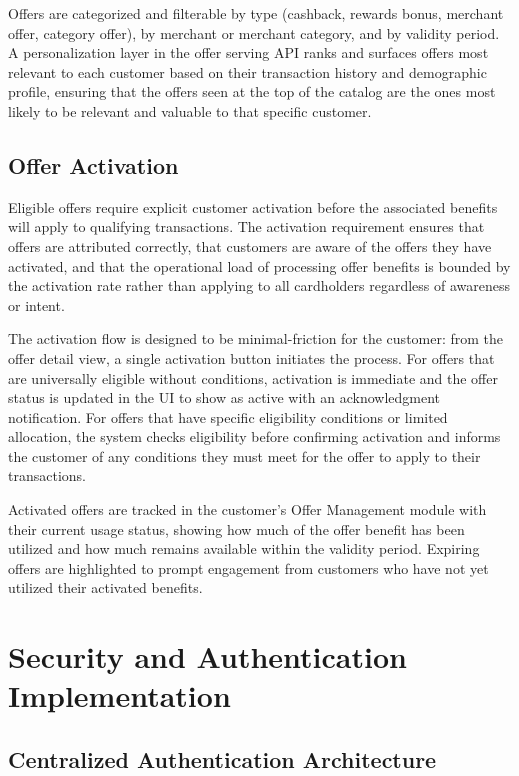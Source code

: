 Offers are categorized and filterable by type (cashback, rewards bonus, merchant offer, category offer), by merchant or merchant category, and by validity period. A personalization layer in the offer serving API ranks and surfaces offers most relevant to each customer based on their transaction history and demographic profile, ensuring that the offers seen at the top of the catalog are the ones most likely to be relevant and valuable to that specific customer.

\subsection{Offer Activation}

Eligible offers require explicit customer activation before the associated benefits will apply to qualifying transactions. The activation requirement ensures that offers are attributed correctly, that customers are aware of the offers they have activated, and that the operational load of processing offer benefits is bounded by the activation rate rather than applying to all cardholders regardless of awareness or intent.

The activation flow is designed to be minimal-friction for the customer: from the offer detail view, a single activation button initiates the process. For offers that are universally eligible without conditions, activation is immediate and the offer status is updated in the UI to show as active with an acknowledgment notification. For offers that have specific eligibility conditions or limited allocation, the system checks eligibility before confirming activation and informs the customer of any conditions they must meet for the offer to apply to their transactions.

Activated offers are tracked in the customer's Offer Management module with their current usage status, showing how much of the offer benefit has been utilized and how much remains available within the validity period. Expiring offers are highlighted to prompt engagement from customers who have not yet utilized their activated benefits.

\section{Security and Authentication Implementation}

\subsection{Centralized Authentication Architecture}

